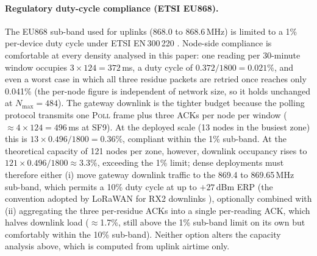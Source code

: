 \documentclass[pdflatex,sn-mathphys-num]{sn-jnl}
\theoremstyle{thmstyleone}
\theoremstyle{thmstyletwo}
\theoremstyle{thmstylethree}
\begin{document}
\paragraph{Regulatory duty-cycle compliance (ETSI EU868).}
The EU868 sub-band used for uplinks (868.0 to 868.6\,MHz) is limited to a 1\% per-device duty cycle under ETSI EN\,300\,220 \cite{ttn2024eu868,loraalliance2021regional}. Node-side compliance is comfortable at every density analysed in this paper: one reading per 30-minute window occupies $3 \times 124 = 372$\,ms, a duty cycle of $0.372/1800 = 0.021\%$, and even a worst case in which all three residue packets are retried once reaches only 0.041\% (the per-node figure is independent of network size, so it holds unchanged at $N_{\max} = 484$). The gateway downlink is the tighter budget because the polling protocol transmits one \textsc{Poll} frame plus three ACKs per node per window ($\approx 4 \times 124 = 496$\,ms at SF9). At the deployed scale (13 nodes in the busiest zone) this is $13 \times 0.496/1800 = 0.36\%$, compliant within the 1\% sub-band. At the theoretical capacity of 121 nodes per zone, however, downlink occupancy rises to $121 \times 0.496/1800 \approx 3.3\%$, exceeding the 1\% limit; dense deployments must therefore either (i) move gateway downlink traffic to the 869.4 to 869.65\,MHz sub-band, which permits a 10\% duty cycle at up to $+27$\,dBm ERP (the convention adopted by LoRaWAN for RX2 downlinks \cite{ttn2024eu868}), optionally combined with (ii) aggregating the three per-residue ACKs into a single per-reading ACK, which halves downlink load ($\approx$1.7\%, still above the 1\% sub-band limit on its own but comfortably within the 10\% sub-band). Neither option alters the capacity analysis above, which is computed from uplink airtime only.
\end{document}
